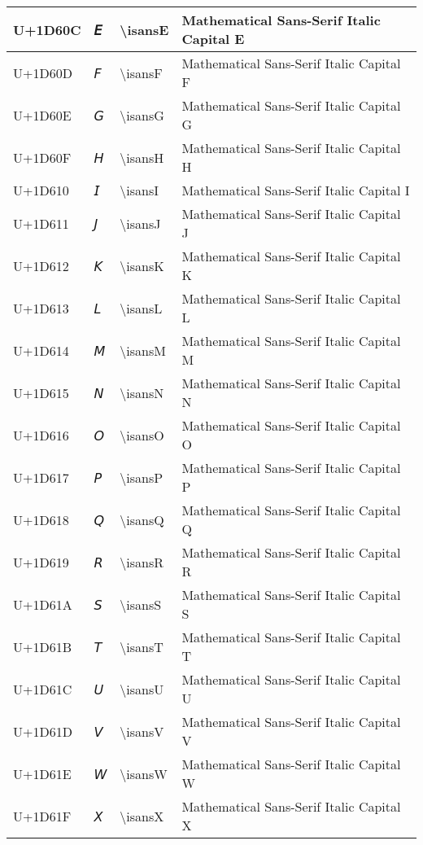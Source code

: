 \begin{table}[h]
\begin{tabulary}{\linewidth}{|L|L|L|L|}
\hline
U+1D60C & 𝘌 & {\textbackslash}isansE & Mathematical Sans-Serif Italic Capital E \\
\hline
U+1D60D & 𝘍 & {\textbackslash}isansF & Mathematical Sans-Serif Italic Capital F \\
\hline
U+1D60E & 𝘎 & {\textbackslash}isansG & Mathematical Sans-Serif Italic Capital G \\
\hline
U+1D60F & 𝘏 & {\textbackslash}isansH & Mathematical Sans-Serif Italic Capital H \\
\hline
U+1D610 & 𝘐 & {\textbackslash}isansI & Mathematical Sans-Serif Italic Capital I \\
\hline
U+1D611 & 𝘑 & {\textbackslash}isansJ & Mathematical Sans-Serif Italic Capital J \\
\hline
U+1D612 & 𝘒 & {\textbackslash}isansK & Mathematical Sans-Serif Italic Capital K \\
\hline
U+1D613 & 𝘓 & {\textbackslash}isansL & Mathematical Sans-Serif Italic Capital L \\
\hline
U+1D614 & 𝘔 & {\textbackslash}isansM & Mathematical Sans-Serif Italic Capital M \\
\hline
U+1D615 & 𝘕 & {\textbackslash}isansN & Mathematical Sans-Serif Italic Capital N \\
\hline
U+1D616 & 𝘖 & {\textbackslash}isansO & Mathematical Sans-Serif Italic Capital O \\
\hline
U+1D617 & 𝘗 & {\textbackslash}isansP & Mathematical Sans-Serif Italic Capital P \\
\hline
U+1D618 & 𝘘 & {\textbackslash}isansQ & Mathematical Sans-Serif Italic Capital Q \\
\hline
U+1D619 & 𝘙 & {\textbackslash}isansR & Mathematical Sans-Serif Italic Capital R \\
\hline
U+1D61A & 𝘚 & {\textbackslash}isansS & Mathematical Sans-Serif Italic Capital S \\
\hline
U+1D61B & 𝘛 & {\textbackslash}isansT & Mathematical Sans-Serif Italic Capital T \\
\hline
U+1D61C & 𝘜 & {\textbackslash}isansU & Mathematical Sans-Serif Italic Capital U \\
\hline
U+1D61D & 𝘝 & {\textbackslash}isansV & Mathematical Sans-Serif Italic Capital V \\
\hline
U+1D61E & 𝘞 & {\textbackslash}isansW & Mathematical Sans-Serif Italic Capital W \\
\hline
U+1D61F & 𝘟 & {\textbackslash}isansX & Mathematical Sans-Serif Italic Capital X \\

\end{tabulary}
\end{table}
